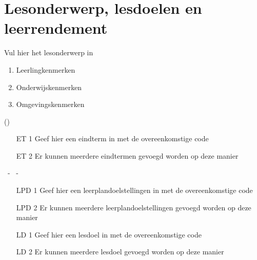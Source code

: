 
\section{Lesonderwerp, lesdoelen en leerrendement}

    Vul hier het lesonderwerp in

    \begin{enumerate}
        \item{Leerlingkenmerken}
        \item{Onderwijskenmerken}
        \item{Omgevingskenmerken}
    \end{enumerate}

(\theleerplanurl)

    \begin{enumerate}
        \item[ET 1]{Geef hier een eindterm in met de overeenkomstige code}
        \item[ET 2]{Er kunnen meerdere eindtermen gevoegd worden op deze manier}
    \end{enumerate}

\thekoepel ~- \theleerplannummer ~- \theleerplanurl

    \begin{enumerate}
        \item[LPD 1]{Geef hier een leerplandoelstellingen in met de overeenkomstige code}
        \item[LPD 2]{Er kunnen meerdere leerplandoelstellingen gevoegd worden op deze manier}
    \end{enumerate}


    \begin{enumerate}
        \item[LD 1]{Geef hier een lesdoel in met de overeenkomstige code}
        \item[LD 2]{Er kunnen meerdere lesdoel gevoegd worden op deze manier}
    \end{enumerate}